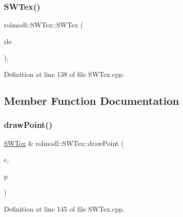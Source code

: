 \subsubsection{\texorpdfstring{SWTex()}{SWTex()}\hspace{0.1cm}{\footnotesize\ttfamily [2/2]}}
{\footnotesize\ttfamily rolmodl\+::\+S\+W\+Tex\+::\+S\+W\+Tex (\begin{DoxyParamCaption}\item[{\mbox{\hyperlink{classrolmodl_1_1_s_w_tex___r_l_e}{S\+W\+Tex\+\_\+\+R\+LE}} \&\&}]{rle }\end{DoxyParamCaption})\hspace{0.3cm}{\ttfamily [explicit]}, {\ttfamily [noexcept]}}



Definition at line 138 of file S\+W\+Tex.\+cpp.



\subsection{Member Function Documentation}
\mbox{\label{classrolmodl_1_1_s_w_tex_abdd47f609baa71927b3d18ed673b68d5}} 
\subsubsection{\texorpdfstring{drawPoint()}{drawPoint()}}
{\footnotesize\ttfamily \mbox{\hyperlink{classrolmodl_1_1_s_w_tex}{S\+W\+Tex}} \& rolmodl\+::\+S\+W\+Tex\+::draw\+Point (\begin{DoxyParamCaption}\item[{const \mbox{\hyperlink{structrolmodl_1_1_r_g_b_a}{R\+G\+BA}}}]{c,  }\item[{const \mbox{\hyperlink{structrolmodl_1_1geom_1_1_pos}{geom\+::\+Pos}}}]{p }\end{DoxyParamCaption})\hspace{0.3cm}{\ttfamily [noexcept]}}



Definition at line 145 of file S\+W\+Tex.\+cpp.

\mbox{\label{classrolmodl_1_1_s_w_tex_ac0f74d111d9588d1ddfa76ace706967e}} 
